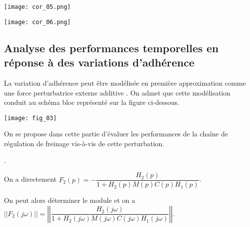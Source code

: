 \begin{multicols}{2}
\begin{corrige}
\begin{center}
\texttt{[image: cor\_05.png]}
\end{center}
\end{corrige}
\else
\fi


\ifprof
\begin{corrige}
\begin{center}
\texttt{[image: cor\_06.png]}
\end{center}
\end{corrige}
\else
\fi

\subsection*{Analyse des performances temporelles en réponse à des variations d’adhérence}
\ifprof
\else
La variation d’adhérence peut être modélisée en première approximation comme une force perturbatrice externe additive . On admet que cette modélisation conduit au schéma bloc représenté sur la figure ci-dessous.

\begin{center}
\texttt{[image: fig\_03]}
\end{center}

On se propose dans cette partie d’évaluer les performances de la chaîne de régulation de freinage vis-à-vis de cette perturbation.

\fi

.

\ifprof
\begin{corrige}
On a directement $F_2(p)=-\dfrac{H_2(p)}{1+H_2(p)M(p)C(p)H_1(p)}$.

On peut alors déterminer le module et on a $||F_2(j\omega)||=\left|\left|\dfrac{H_2(j\omega)}{1+H_2(j\omega)M(j\omega)C(j\omega)H_1(j\omega)}\right|\right|$. 


\end{corrige}
\end{multicols}
